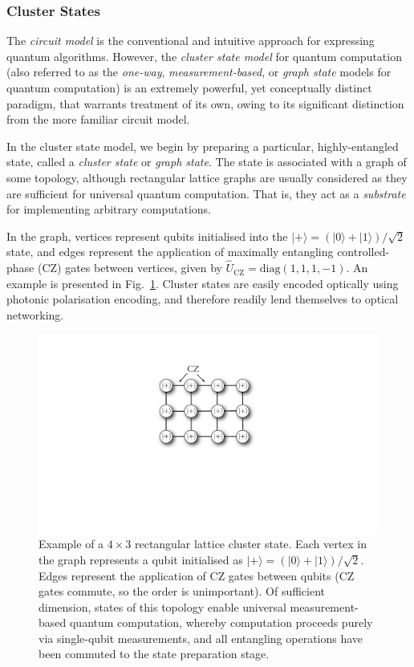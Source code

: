 \documentclass[aps,rmp,twocolumn,amsmath,amssymb,nofootinbib,superscriptaddress]{revtex4}
\newcommand{\ket}[1]{|#1\rangle}
\newcommand{\comment}[1]{{\color{blue}{\textbf{#1}}}}
\begin{document}
\comment{Say more about this}

%
%

\subsubsection{Cluster States} \label{sec:CSQC}

The \emph{circuit model} is the conventional and intuitive approach for expressing quantum algorithms. However, the \emph{cluster state model} for quantum computation \cite{bib:Raussendorf01, bib:Raussendorf03, bib:Nielsen06} (also referred to as the \emph{one-way}, \emph{measurement-based}, or \emph{graph state} models for quantum computation) is an extremely powerful, yet conceptually distinct paradigm, that warrants treatment of its own, owing to its significant distinction from the more familiar circuit model.

In the cluster state model, we begin by preparing a particular, highly-entangled state, called a \emph{cluster state} or \emph{graph state}. The state is associated with a graph of some topology, although rectangular lattice graphs are usually considered as they are sufficient for universal quantum computation. That is, they act as a \emph{substrate} for implementing arbitrary computations.

In the graph, vertices represent qubits initialised into the \mbox{$\ket{+}=(\ket{0}+\ket{1})/\sqrt{2}$} state, and edges represent the application of maximally entangling controlled-phase (CZ) gates between vertices, given by \mbox{$\hat{U}_\mathrm{CZ}=\mathrm{diag}(1,1,1,-1)$}. An example is presented in Fig.~\ref{fig:cluster_state}. Cluster states are easily encoded optically using photonic polarisation encoding, and therefore readily lend themselves to optical networking.

\begin{figure}[!htb]
\includegraphics[width=0.6\columnwidth]{cluster_state}
\caption{Example of a \mbox{$4\times 3$} rectangular lattice cluster state. Each vertex in the graph represents a qubit initialised as \mbox{$\ket{+}=(\ket{0}+\ket{1})/\sqrt{2}$}. Edges represent the application of CZ gates between qubits (CZ gates commute, so the order is unimportant). Of sufficient dimension, states of this topology enable universal measurement-based quantum computation, whereby computation proceeds purely via single-qubit measurements, and all entangling operations have been commuted to the state preparation stage.} \label{fig:cluster_state}
\end{figure}
\end{document}
